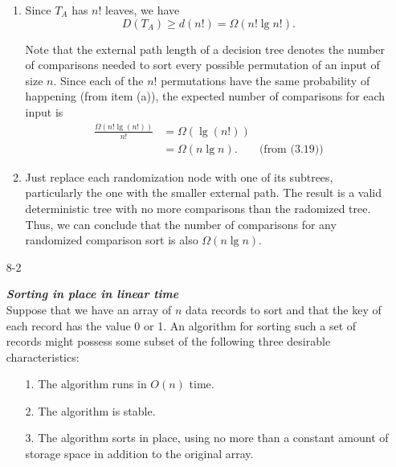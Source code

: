 \begin{enumerate}
\begin{framed}
\begin{enumerate}
\item{Since $T_A$ has $n!$ leaves, we have
\[
  D(T_A) \ge d(n!) = \Omega(n! \lg n!).
\]

Note that the external path length of a decision tree denotes the number of
comparisons needed to sort every possible permutation of an input of size $n$.
Since each of the $n!$ permutations have the same probability of happening
(from item (a)), the expected number of comparisons for each input is
\begin{equation*}
\begin{aligned}
  \frac{\Omega(n! \lg (n!))}{n!} &= \Omega(\lg (n!))\\
                                 &= \Omega(n \lg n). & \text{(from (3.19))}
\end{aligned}
\end{equation*}
}

\item{Just replace each randomization node with one of its subtrees,
particularly the one with the smaller external path. The result is a valid
deterministic tree with no more comparisons than the radomized tree. Thus, we
can conclude that the number of comparisons for any randomized comparison sort
is also $\Omega(n \lg n)$}.

\end{enumerate}
\end{framed}

\newpage

\item[8-2]{\textbf{\emph{Sorting in place in linear time}}\\
Suppose that we have an array of $n$ data records to sort and that the key of
each record has the value 0 or 1. An algorithm for sorting such a set of records
might possess some subset of the following three desirable characteristics:
\begin{enumerate}
  \item[1.] The algorithm runs in $O(n)$ time.
  \item[2.] The algorithm is stable.
  \item[3.] The algorithm sorts in place, using no more than a constant
    amount of storage space in addition to the original array.
\end{enumerate}

}
\end{enumerate}
